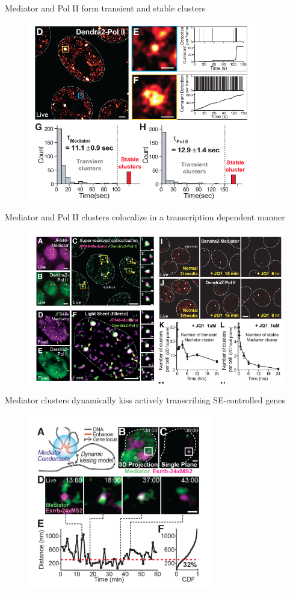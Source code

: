 \documentclass[aspectratio=1610]{beamer}					%
\begin{document}
\begin{frame}{Mediator and Pol II form transient and stable clusters}
\begin{figure}
\includegraphics[width=10cm]{figure-1-2.png}
\end{figure}
\end{frame}


\begin{frame}{Mediator  and  Pol  II  clusters  colocalize  in  a  transcription  dependent  manner}
\begin{figure}
\includegraphics[width=13cm]{figure-2-1.png}
\end{figure}
\end{frame}


\begin{frame}{Mediator   clusters   dynamically   kiss   actively  transcribing SE-controlled  genes}
\begin{figure}
\includegraphics[width=8cm]{figure-3-1.png}
\end{figure}
\end{frame}
\end{document}
